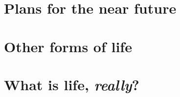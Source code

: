 \documentclass[DIV=calc, paper=a4, fontsize=12pt]{scrartcl}	 %
\begin{document}
{\begin{multicols}{2}



\end{multicols} \noindent\makebox[\linewidth]{\rule{\textwidth}{0.4pt}}




\section{Plans for the near future}

\begin{multicols}{2}






\end{multicols} \noindent\makebox[\linewidth]{\rule{\textwidth}{0.4pt}}

\section{Other forms of life}

\begin{multicols}{2}



\end{multicols} \noindent\makebox[\linewidth]{\rule{\textwidth}{0.4pt}}


\section*{What is life, \textit{really}?}

\begin{multicols}{2}






\end{multicols}}
\end{document}
